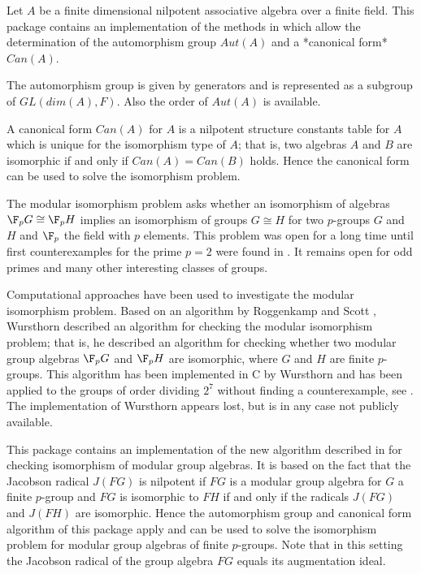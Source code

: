
Let $A$ be a finite dimensional nilpotent associative algebra over a 
finite field. This package contains an implementation of the methods 
in \cite{Eic07} which allow the determination of the automorphism group 
$Aut(A)$ and a *canonical form* $Can(A)$. 

The automorphism group is given by generators and is represented as a
subgroup of $GL(dim(A), F)$. Also the order of $Aut(A)$ is available.

A canonical form $Can(A)$ for $A$ is a nilpotent structure constants 
table for $A$ which is unique for the isomorphism type of $A$; 
that is, two algebras $A$ and $B$ are isomorphic if and only if $Can(A) 
= Can(B)$ holds. Hence the canonical form can be used to solve the 
isomorphism problem. 


The modular isomorphism problem asks whether an isomorphism of algebras $\F_p G \cong \F_p H$ implies
an isomorphism of groups $G \cong H$ for two $p$-groups $G$ and $H$ and $\F_p$ the field with $p$
elements. This problem was open for a long time until first counterexamples
for the prime $p=2$ were found in \cite{GLMdR22}. It remains open for odd
primes and many other interesting classes of groups.

Computational approaches have been used to investigate the modular isomorphism
problem. Based on an algorithm by Roggenkamp and Scott \cite{RS93}, Wursthorn
\cite{Wur93} described an algorithm for checking the modular isomorphism
problem; that is, he described an algorithm for checking whether two modular
group algebras $\F_p G$ and $\F_p H$ are isomorphic, where $G$ and $H$ are finite
$p$-groups. This algorithm has been
implemented in C by Wursthorn and has been applied to the groups of
order dividing $2^7$ without finding a counterexample, see \cite{BKRW99}.
The implementation of Wursthorn appears lost, but is in any case not publicly
available.
\medskip

This package contains an implementation of the new algorithm described in
\cite{Eic07} for checking isomorphism of modular group algebras. It is based
on the fact that the Jacobson radical $J(FG)$ is nilpotent if $FG$ is a 
modular group algebra for $G$ a finite $p$-group and $FG$ is isomorphic to $FH$ if and only if the radicals
$J(FG)$ and $J(FH)$ are isomorphic. Hence the automorphism group and canonical form 
algorithm of this package apply and can be used to solve the isomorphism
problem for modular group algebras of finite $p$-groups. Note that in this setting the Jacobson radical of the group algebra $FG$ equals its augmentation ideal.


